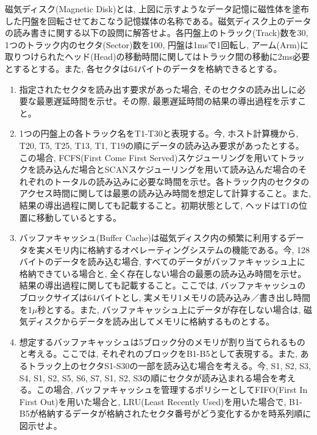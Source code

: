 \documentclass[dvipdfmx,titlepage, 11pt, a4paper]{jsarticle}%
\begin{document}
\noindent 磁気ディスク(Magnetic Disk)とは, 上図に示すようなデータ記憶に磁性体を塗布した円盤を回転させておこなう記憶媒体の名称である。磁気ディスク上のデータの読み書きに関する以下の設問に解答せよ。各円盤上のトラック(Track)数を30, 1つのトラック内のセクタ(Sector)数を100, 円盤は1msで1回転し, アーム(Arm)に取りつけられたヘッド(Head)の移動時間に関してはトラック間の移動に2ms必要とするとする。また, 各セクタは64バイトのデータを格納できるとする。
\begin{enumerate}[(1)]
  \setlength{\itemsep}{15pt}
\item 指定されたセクタを読み出す要求があった場合, そのセクタの読み出しに必要な最悪遅延時間を示せ。その際, 最悪遅延時間の結果の導出過程を示すこと。
\item 1つの円盤上の各トラック名をT1-T30と表現する。今, ホスト計算機から, T20, T5, T25, T13, T1, T19の順にデータの読み込み要求があったとする。この場合, FCFS(First Come First Served)スケジューリングを用いてトラックを読み込んだ場合とSCANスケジューリングを用いて読み込んだ場合のそれぞれのトータルの読み込みに必要な時間を示せ。各トラック内のセクタのアクセス時間に関しては最悪の読み込み時間を想定して計算すること。また, 結果の導出過程に関しても記載すること。初期状態として, ヘッドはT1の位置に移動しているとする。
\item バッファキャッシュ(Buffer Cache)は磁気ディスク内の頻繁に利用するデータを実メモリ内に格納するオペレーティングシステムの機能である。今, 128バイトのデータを読み込む場合, すべてのデータがバッファキャッシュ上に格納できている場合と, 全く存在しない場合の最悪の読み込み時間を示せ。結果の導出過程に関しても記載すること。ここでは, バッファキャッシュのブロックサイズは64バイトとし, 実メモリ1メモリの読み込み／書き出し時間を1$\mu$秒とする。また, バッファキャッシュ上にデータが存在しない場合は, 磁気ディスクからデータを読み出してメモリに格納するものとする。
\item 想定するバッファキャッシュは5ブロック分のメモリが割り当てられるものと考える。ここでは, それぞれのブロックをB1-B5として表現する。また, あるトラック上のセクタS1-S30の一部を読み込む場合を考える。今, S1, S2, S3, S4, S1, S2, S5, S6, S7, S1, S2, S3の順にセクタが読み込まれる場合を考える。この場合, バッファキャッシュを管理するポリシーとしてFIFO(First In First Out)を用いた場合と, LRU(Least Recently Used)を用いた場合で, B1-B5が格納するデータが格納されたセクタ番号がどう変化するかを時系列順に図示せよ。
\end{enumerate}
\end{document}
